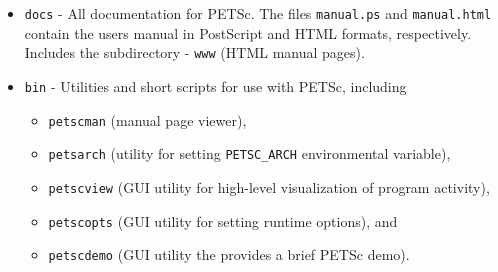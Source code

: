 \begin{itemize}
\item {\tt docs} - All documentation for PETSc. The files {\tt manual.ps}
                   and {\tt manual.html} contain the users manual in
                   PostScript and HTML formats, respectively. Includes
                   the subdirectory
 \subitem - {\tt www} (HTML manual pages).
\item {\tt bin} - Utilities and short scripts for use with PETSc, including
 \begin{itemize}
 \item {\tt petscman} (manual page viewer),
 \item {\tt petsarch} (utility for setting {\tt PETSC\_ARCH} environmental variable),
 \item {\tt petscview} (GUI utility for high-level visualization of program activity),
 \item {\tt petscopts} (GUI utility for setting runtime options), and
 \item {\tt petscdemo} (GUI utility the provides a brief PETSc demo).
 \end{itemize}


\end{itemize}
